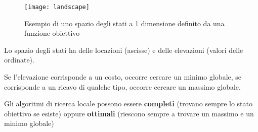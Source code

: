 \begin{figure}[H]
\centering
\texttt{[image: landscape]}
\caption{Esempio di uno spazio degli stati a 1 dimensione definito da una
funzione obiettivo}
\label{fig:landscape}
\end{figure}

Lo spazio degli stati ha delle locazioni (ascisse) e delle elevazioni
(valori delle ordinate).

Se l'elevazione corrisponde a un costo, occorre cercare un minimo globale,
se corrisponde a un ricavo di qualche tipo, occorre cercare un massimo globale.

Gli algoritmi di ricerca locale possono essere \textbf{completi} (trovano
sempre lo stato obiettivo se esiste) oppure \textbf{ottimali} (riescono sempre a
trovare un massimo e un minimo globale)

